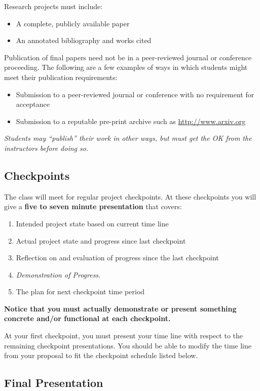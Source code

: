 \documentclass[10pt]{article}
\begin{document}
Research projects must include:
\begin{itemize}
\item A complete, publicly available paper 
\item An annotated bibliography and works cited
\end{itemize}

Publication of final papers need not be in a peer-reviewed journal or conference proceeding.  The following are a few examples of ways in which students might meet their publication requirements:
\begin{itemize}
\item Submission to a peer-reviewed journal or conference with no requirement for acceptance
\item Submission to a reputable pre-print archive such as \url{http://www.arxiv.org}
\end{itemize}
\textit{Students may ``publish'' their work in other ways, but must get the OK from the instructors before doing so.}


\subsection{Checkpoints}

The class will meet for regular project checkpoints. At these checkpoints you will give a \textbf{five to seven minute presentation} that covers:
\begin{enumerate}
\item Intended project state based on current time line
\item Actual project state and progress since last checkpoint
\item Reflection on and evaluation of progress since the last checkpoint
\item \textit{Demonstration of Progress.} 
\item The plan for next checkpoint time period
\end{enumerate}
\textbf{Notice that you must actually demonstrate or present something concrete and/or functional at each checkpoint.} 

At your first checkpoint, you must present your time line with respect to the remaining checkpoint presentations. You should be able to modify the time line from your proposal to fit the checkpoint schedule listed below.


\subsection{Final Presentation}
 
\end{document}
